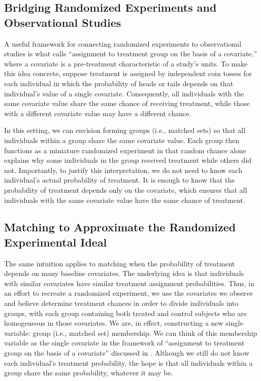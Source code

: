 \documentclass[twoside,11pt]{article}
\begin{document}
\subsection{Bridging Randomized Experiments and Observational
Studies}\label{bridging-randomized-experiments-and-observational-studies}

A useful framework for connecting randomized experiments to
observational studies is what \citet{rubin1977} calls ``assignment to
treatment group on the basis of a covariate,'' where a covariate is a
pre-treatment characteristic of a study's units. To make this idea
concrete, suppose treatment is assigned by independent coin tosses for
each individual in which the probability of heads or tails depends on
that individual's value of a single covariate. Consequently, all
individuals with the same covariate value share the same chance of
receiving treatment, while those with a different covariate value
may have a different chance.

In this setting, we can envision forming groups (i.e., matched sets) so
that all individuals within a group share the same covariate value. Each
group then functions as a miniature randomized experiment in that random
chance alone explains why some individuals in the group received
treatment while others did not. Importantly, to justify this
interpretation, we do not need to know each individual's actual
probability of treatment. It is enough to know that the probability of
treatment depends only on the covariate, which ensures that all
individuals with the same covariate value have the same chance of
treatment.

\subsection{Matching to Approximate the Randomized Experimental
Ideal}\label{matching-to-approximate-the-randomized-experimental-ideal}

The same intuition applies to matching when the probability of treatment
depends on many baseline covariates. The underlying idea is that
individuals with similar covariates have similar treatment assignment
probabilities. Thus, in an effort to recreate a randomized experiment,
we use the covariates we observe and believe determine treatment chances
in order to divide individuals into groups, with each group containing
both treated and control subjects who are homogeneous in those
covariates. We are, in effect, constructing a new single variable: group
(i.e., matched set) membership. We can think of this membership variable
as the single covariate in the framework of ``assignment to treatment
group on the basis of a covariate'' \citep{rubin1977} discussed in
.
Although we still do not know each individual's treatment probability,
the hope is that all individuals within a group share the same
probability, whatever it may be.
\end{document}

